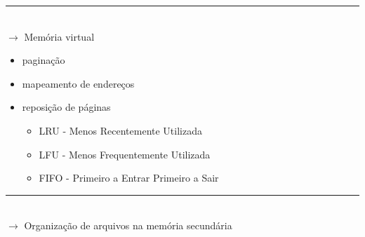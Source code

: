 \documentclass[a4paper, 12pt]{article}
\begin{document}
\rule{12cm}{0.4pt}\\

\color{red}
$\rightarrow$ Memória virtual\\
\begin{itemize}
\item paginação
\item mapeamento de endereços
\item reposição de páginas
\begin{itemize}
\item LRU - Menos Recentemente Utilizada
\item LFU - Menos Frequentemente Utilizada
\item FIFO - Primeiro a Entrar Primeiro a Sair\\
\end{itemize}
\end{itemize}

\rule{12cm}{0.4pt}\\

\color{black}
$\rightarrow$ Organização de arquivos na memória secundária
\end{document}
